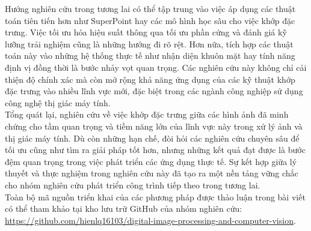 Hướng nghiên cứu trong tương lai có thể tập trung vào việc áp dụng các thuật toán tiên tiến hơn như SuperPoint hay các mô hình học sâu cho việc khớp đặc trưng. Việc tối ưu hóa hiệu suất thông qua tối ưu phần cứng và đánh giá kỹ lưỡng trải nghiệm cũng là những hướng đi rõ rệt. Hơn nữa, tích hợp các thuật toán này vào những hệ thống thực tế như nhận diện khuôn mặt hay tính năng định vị đồng thời là bước nhảy vọt quan trọng. Các nghiên cứu này không chỉ cải thiện độ chính xác mà còn mở rộng khả năng ứng dụng của các kỹ thuật khớp đặc trưng vào nhiều lĩnh vực mới, đặc biệt trong các ngành công nghiệp sử dụng công nghệ thị giác máy tính.\\

Tổng quát lại, nghiên cứu về việc khớp đặc trưng giữa các hình ảnh đã minh chứng cho tầm quan trọng và tiềm năng lớn của lĩnh vực này trong xử lý ảnh và thị giác máy tính. Dù còn những hạn chế, đòi hỏi các nghiên cứu chuyên sâu để tối ưu cũng như tìm ra giải pháp tốt hơn, nhưng những kết quả đạt được là bước đệm quan trọng trong việc phát triển các ứng dụng thực tế. Sự kết hợp giữa lý thuyết và thực nghiệm trong nghiên cứu này đã tạo ra một nền tảng vững chắc cho nhóm nghiên cứu phát triển công trình tiếp theo trong tương lai.\\

Toàn bộ mã nguồn triển khai của các phương pháp được thảo luận trong bài viết có thể tham khảo tại kho lưu trữ GitHub của nhóm nghiên cứu: \url{https://github.com/hienlq16103/digital-image-processing-and-computer-vision}.